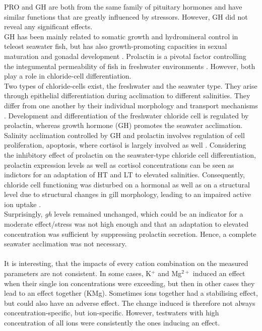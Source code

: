 \documentclass[twoside]{article}
\begin{document}
\begin{multicols}{2}
PRO and GH are both from the same family of pituitary hormones and have similar functions that are greatly influenced by stressors.  However, GH did not reveal any significant effects. \\
GH has been mainly related to somatic growth and hydromineral control in teleost seawater fish, but has also growth-promoting capacities in sexual maturation and gonadal development \citep{pickering1989}. %
Prolactin is a pivotal factor controlling the integumental permeability of fish in freshwater environments \citep{bonga1997}. However, both play a role in chloride-cell differentiation. \\
Two types of chloride-cells exist, the freshwater and the seawater type. They arise through epithelial differentiation during acclimation to different salinities. They differ from one another by their individual morphology and transport mechanisms \citep{Mccormick2001}. 
Development and differentiation of the freshwater chloride cell is regulated by prolactin, whereas growth hormone (GH) promotes the seawater acclimation. Salinity acclimation controlled by GH and prolactin involves regulation of cell proliferation, apoptosis, where cortisol is largely involved as well \citep{Sakamoto2006}. Considering the inhibitory effect of prolactin on the seawater-type chloride cell differentiation, prolactin expression levels as well as cortisol concentrations can be seen  as indictors for an  adaptation of HT and LT to elevated salinities. Consequently, chloride cell functioning was disturbed on a hormonal as well as on a structural level due to structural changes in gill morphology, leading to an impaired active ion uptake \citep{sardella2004}. \\ Surprisingly, \textit{gh} levels remained unchanged, which could be an indicator for a moderate effect/stress was not high enough and that an adaptation to elevated concentration was sufficient by suppressing prolactin secretion. Hence, a complete seawater acclimation was not necessary.  \\ \\ 
It is interesting, that the impacts of every cation combination on the measured parameters are not consistent. In some cases, K$^+$ and Mg$^{2+}$ induced an effect when their single ion concentrations were exceeding, but then in other cases they lead to an effect together (KMg). Sometimes ions together had a stabilising effect, but could also have an adverse effect. The change induced is therefore not always concentration-specific, but ion-specific.  However, testwaters with high concentration of all ions were consistently the ones inducing an effect. \\ 

\end{multicols}
\end{document}
